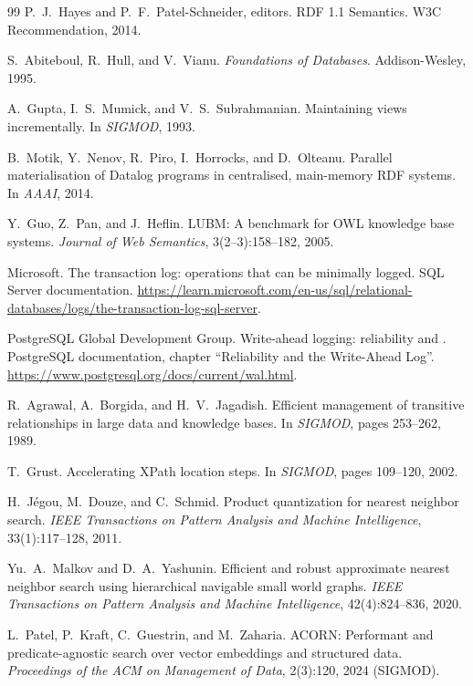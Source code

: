 \begin{thebibliography}{99}
 P.~J.~Hayes and P.~F.~Patel-Schneider, editors. RDF 1.1 Semantics. W3C Recommendation, 2014.

 S.~Abiteboul, R.~Hull, and V.~Vianu. \emph{Foundations of Databases}. Addison-Wesley, 1995.

 A.~Gupta, I.~S.~Mumick, and V.~S.~Subrahmanian. Maintaining views incrementally. In \emph{SIGMOD}, 1993.

 B.~Motik, Y.~Nenov, R.~Piro, I.~Horrocks, and D.~Olteanu. Parallel materialisation of Datalog programs in centralised, main-memory RDF systems. In \emph{AAAI}, 2014.

 Y.~Guo, Z.~Pan, and J.~Heflin. LUBM: A benchmark for OWL knowledge base systems. \emph{Journal of Web Semantics}, 3(2--3):158--182, 2005.

 Microsoft. The transaction log: operations that can be minimally logged. SQL Server documentation. \url{https://learn.microsoft.com/en-us/sql/relational-databases/logs/the-transaction-log-sql-server}.

 PostgreSQL Global Development Group. Write-ahead logging: reliability and . PostgreSQL documentation, chapter ``Reliability and the Write-Ahead Log''. \url{https://www.postgresql.org/docs/current/wal.html}.

 R.~Agrawal, A.~Borgida, and H.~V.~Jagadish. Efficient management of transitive relationships in large data and knowledge bases. In \emph{SIGMOD}, pages 253--262, 1989.

 T.~Grust. Accelerating XPath location steps. In \emph{SIGMOD}, pages 109--120, 2002.

 H.~J\'egou, M.~Douze, and C.~Schmid. Product quantization for nearest neighbor search. \emph{IEEE Transactions on Pattern Analysis and Machine Intelligence}, 33(1):117--128, 2011.

 Yu.~A.~Malkov and D.~A.~Yashunin. Efficient and robust approximate nearest neighbor search using hierarchical navigable small world graphs. \emph{IEEE Transactions on Pattern Analysis and Machine Intelligence}, 42(4):824--836, 2020.

 L.~Patel, P.~Kraft, C.~Guestrin, and M.~Zaharia. ACORN: Performant and predicate-agnostic search over vector embeddings and structured data. \emph{Proceedings of the ACM on Management of Data}, 2(3):120, 2024 (SIGMOD).


\end{thebibliography}
